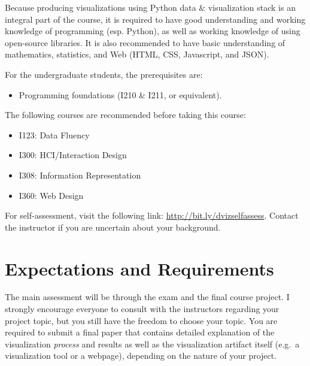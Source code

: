 \documentclass[11pt,article,oneside]{memoir} %
\begin{document}
Because producing visualizations using Python data \& visualization stack is an integral part of the course, it is required to have good understanding and working knowledge of programming (esp. Python), as well as working knowledge of using open-source libraries. 
It is also recommended to have basic understanding of mathematics, statistics, and Web (HTML, CSS, Javascript, and JSON). 

For the undergraduate students, the prerequisites are:
%
\begin{itemize}\vspace{-10pt}
%
\item Programming foundations (I210 \& I211, or equivalent). 
%
\end{itemize}
%
The following courses are recommended before taking this course: 
%
\begin{itemize}\vspace{-10pt}
%
\item I123: Data Fluency \item I300: HCI/Interaction Design \item I308:
Information Representation \item I360: Web Design
%
\end{itemize}

For self-assessment, visit the following link: \href{http://bit.ly/dvizselfassess}{http://bit.ly/dvizselfassess}. 
Contact the instructor if you are uncertain about your background. 

\section{Expectations and Requirements}%
\label{sec:requirements}

The main assessment will be through the exam and the final course project. 
I strongly encourage everyone to consult with the instructors regarding your project topic, but you still have the freedom to choose your topic.
You are required to submit a final paper that contains detailed explanation of the visualization \emph{process} and results as well as the visualization artifact itself (e.g.~a visualization tool or a webpage), depending on the nature of your project. 
\end{document}

